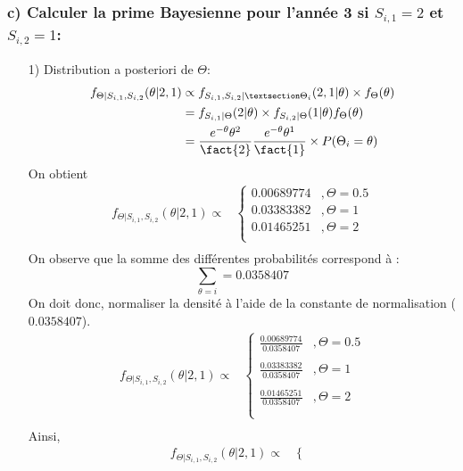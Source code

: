 \subsubsection*{c) Calculer la prime Bayesienne pour l'année 3 si $S_{i,1} = 2$  et $S_{i,2} = 1$:}
\begin{itemize}
\item[1)] Distribution a posteriori de $\Theta$:
\begin{align*}
f_{\Theta|S_{i,1},S_{i,2}}(\theta|2,1) &\propto f_{S_{i,1},S_{i,2}|§\Theta_i}(2,1|\theta) \times f_{\Theta}(\theta) \\
&= f_{S_{i,1}|\Theta}(2|\theta) \times f_{S_{i,2}|\Theta}(1|\theta) f_{\Theta}(\theta) \\
&= \frac{e^{-\theta}\theta^2}{\fact{2}}\frac{e^{-\theta}\theta^1}{\fact{1}} \times P(\Theta_i =\theta)
\end{align*}
On obtient
\begin{align*}
f_{\Theta|S_{i,1},S_{i,2}}(\theta|2,1) \propto & \left\{
     \begin{array}{rl}
      0.00689774 &, \Theta = 0.5 \\
      0.03383382 &, \Theta = 1 \\
      0.01465251 &, \Theta = 2 \\
     \end{array}
     \right. \\
\end{align*}
On observe que la somme des différentes probabilités correspond à :
 $$ \sum_{\theta = i} = 0.0358407 $$
On doit donc, normaliser la densité à l'aide de la constante de normalisation ($0.0358407$).
\begin{align*}
f_{\Theta|S_{i,1},S_{i,2}}(\theta|2,1) \propto & \left\{
     \begin{array}{rl}
      \frac{0.00689774 }{0.0358407}  &, \Theta = 0.5 \\ \\
      \frac{0.03383382 }{0.0358407}   &, \Theta = 1 \\ \\
      \frac{0.01465251 }{0.0358407}  &, \Theta = 2 \\ \\
     \end{array}
     \right. \\
\end{align*}
Ainsi,
\begin{align*}
f_{\Theta|S_{i,1},S_{i,2}}(\theta|2,1) \propto & \left\{
     \begin{array}{rl}

\end{array}
\end{align*}
\end{itemize}
